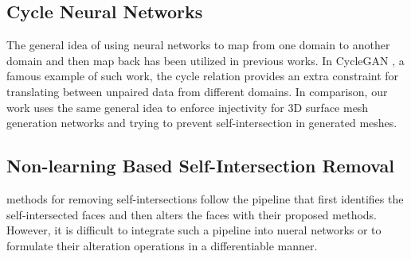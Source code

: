 \subsection{Cycle Neural Networks}
The general idea of using neural networks to map from one domain to another domain and then map back has been utilized in previous works. In CycleGAN \cite{CycleGAN2017}, a famous example of such work, the cycle relation provides an extra constraint for translating between unpaired data from different domains. In comparison, our work uses the same general idea to enforce injectivity for 3D surface mesh generation networks and trying to prevent self-intersection in generated meshes. 

\subsection{Non-learning Based Self-Intersection Removal}
 methods  for removing self-intersections follow the pipeline that first identifies the self-intersected faces and then alters the faces with their proposed methods. However, it is difficult to integrate such a pipeline into nueral networks or to formulate their alteration operations in a differentiable manner. 

